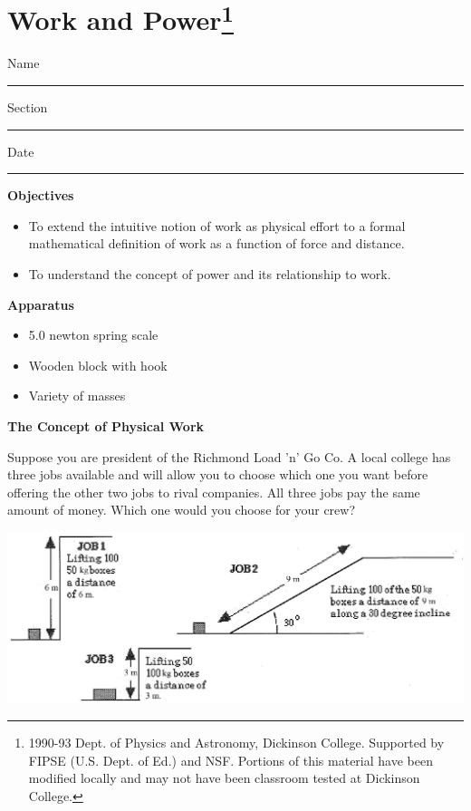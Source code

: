 
\section{Work and Power\footnote{
1990-93 Dept. of Physics and Astronomy, Dickinson College. Supported by FIPSE
(U.S. Dept. of Ed.) and NSF. Portions of this material have been modified locally
and may not have been classroom tested at Dickinson College.
}}

Name \rule{2.0in}{0.1pt}\hfill{}Section \rule{1.0in}{0.1pt}\hfill{}Date \rule{1.0in}{0.1pt}

\textbf{Objectives }

\begin{itemize}
\item To extend the intuitive notion of work as physical effort to a formal mathematical
definition of work as a function of force and distance. 
\item To understand the concept of power and its relationship to work.
\end{itemize}
\textbf{Apparatus }

\begin{itemize}
\item 5.0 newton spring scale 
\item Wooden block with hook 
\item Variety of masses
\end{itemize}
\textbf{The Concept of Physical Work }

Suppose you are president of the Richmond Load 'n' Go Co. A local college has
three jobs available and will allow you to choose which one you want before
offering the other two jobs to rival companies. All three jobs pay the same
amount of money. Which one would you choose for your crew?

\vspace{0.3cm}
{\par\centering \includegraphics[width=6.2in,]{work_power_fig1s.eps} \par}
\vspace{0.3cm}

